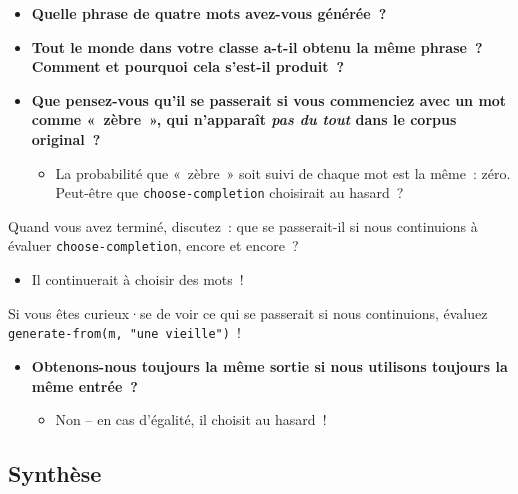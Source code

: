 \documentclass[12pt,a4paper]{article}
\begin{document}
\begin{activitybox}
  \begin{itemize}
    \item \textbf{Quelle phrase de quatre mots avez-vous générée~?}
    \item \textbf{Tout le monde dans votre classe a-t-il obtenu la même phrase~? Comment et pourquoi cela s'est-il produit~?}
    \item \textbf{Que pensez-vous qu'il se passerait si vous commenciez avec un mot comme «~zèbre~», qui n'apparaît \emph{pas du tout} dans le corpus original~?}
    \begin{itemize}
      \item La probabilité que «~zèbre~» soit suivi de chaque mot est la même~: zéro. Peut-être que \texttt{choose-completion} choisirait au hasard~?
    \end{itemize}
  \end{itemize}
\end{activitybox}

\begin{instructornotes}
  Quand vous avez terminé, discutez~: que se passerait-il si nous continuions à évaluer \texttt{choose-completion}, encore et encore~?

  \begin{itemize}
    \item Il continuerait à choisir des mots~!
  \end{itemize}

  Si vous êtes curieux·se de voir ce qui se passerait si nous continuions, évaluez \texttt{generate-from(m, "une vieille")}~!

  \begin{itemize}
    \item \textbf{Obtenons-nous toujours la même sortie si nous utilisons toujours la même entrée~?}
    \begin{itemize}
      \item Non -- en cas d'égalité, il choisit au hasard~!
    \end{itemize}
  \end{itemize}
\end{instructornotes}

\subsection{Synthèse}
\end{document}
